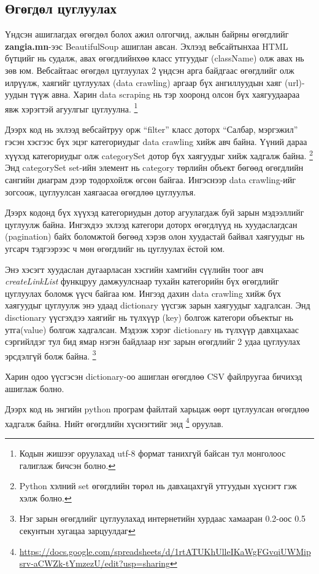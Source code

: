 \subsection{Өгөгдөл цуглуулах}
Үндсэн ашиглагдах өгөгдөл болох ажил олгогчид, ажлын байрны өгөгдлийг \textbf{zangia.mn}-ээс BeautifulSoup ашиглан авсан. Эхлээд вебсайтынхаа HTML бүтцийг нь судалж, авах өгөгдлийнхөө класс утгуудыг (className) олж авах нь зөв юм. Вебсайтаас өгөгдөл цуглуулах 2 үндсэн арга байдгаас өгөгдлийг олж илрүүлж, хаягийг цуглуулах (data crawling) аргаар бүх ангиллуудын хаяг (url)-уудын түүж авна. Харин data scraping нь тэр хооронд олсон бүх хаягуудаараа явж хэрэгтэй агуулгыг цуглуулна. \footnote{Кодын жишээг оруулахад utf-8 формат танихгүй байсан тул монголоос галиглаж бичсэн болно.}

Дээрх код нь эхлээд вебсайтруу орж ``filter'' класс доторх ``Салбар, мэргэжил'' гэсэн хэсгээс бүх эцэг категориудыг data crawling хийж авч байна. Үүний дараа хүүхэд категориудыг олж categorySet дотор бүх хаягуудыг хийж хадгалж байна. \footnote{Python хэлний set өгөгдлийн төрөл нь давхацахгүй утгуудын хүснэгт гэж хэлж болно. } Энд categorySet set-ийн элемент нь category төрлийн объект бөгөөд өгөгдлийн сангийн диаграм дээр тодорхойлж өгсөн байгаа. Ингэснээр data crawling-ийг зогсоож, цуглуулсан хаягаасаа өгөгдлөө цуглуулъя.  

Дээрх кодонд бүх хүүхэд категориудын дотор агуулагдаж буй зарын мэдээллийг цуглуулж байна. Ингэхдээ эхлээд категори доторх өгөгдлүүд нь хуудаслагдсан (pagination) байх боломжтой бөгөөд хэрэв олон хуудастай байвал хаягуудыг нь угсарч тэдгээрээс ч мөн өгөгдлийг нь цуглуулах ёстой юм. 

Энэ хэсэгт хуудаслан дугаарласан хэсгийн хамгийн сүүлийн тоог авч \textit{createLinkList} функцруу дамжуулснаар тухайн категорийн бүх өгөгдлийг цуглуулах боломж үүсч байгаа юм. Ингээд дахин data crawling хийж бүх хаягуудыг цуглуулж энэ удаад dictionary үүсгэж зарын хаягуудыг хадгалсан. Энд disctionary үүсгэхдээ хаягийг нь түлхүүр (key) болгож категори объектыг нь утга(value) болгож хадгалсан. Мэдээж хэрэг dictionary нь түлхүүр давхцахаас сэргийлдэг тул бид ямар нэгэн байдлаар нэг зарын өгөгдлийг 2 удаа цуглуулах эрсдэлгүй болж байна. \footnote{Нэг зарын өгөгдлийг цуглуулахад интернетийн хурдаас хамааран 0.2-оос 0.5 секунтын хугацаа зарцуулдаг}

Харин одоо үүсгэсэн dictionary-оо ашиглан өгөгдлөө CSV файлруугаа бичихэд ашиглаж болно. 

Дээрх код нь энгийн python програм файлтай харьцаж өөрт цуглуулсан өгөгдлөө хадгалж байна. Нийт өгөгдлийн хүснэгтийг энд \footnote{\url{https://docs.google.com/spreadsheets/d/1rtATUKhUlleIKaWgFGvqiUWMipsrv-aCWZk-tYmzezU/edit?usp=sharing}} оруулав.

